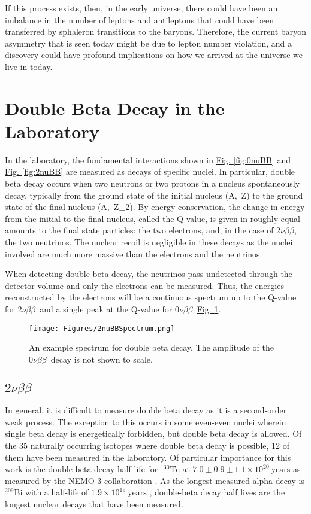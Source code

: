 \documentclass[12pt,a4paper]{article}
\newcommand{\zeronubb}{$0\nu \beta \beta$}
\newcommand{\twonubb}{$2\nu \beta \beta$}
\begin{document}
If this process exists, then, in the early universe, there could have been an imbalance in the number of leptons and antileptons that could have been transferred by sphaleron transitions to the baryons. Therefore, the current baryon asymmetry that is seen today might be due to lepton number violation, and a discovery could have profound implications on how we arrived at the universe we live in today.


\section{Double Beta Decay in the Laboratory}

In the laboratory, the fundamental interactions shown in \hyperref[fig:0nuBB]{Fig. \ref*{fig:0nuBB}} and \hyperref[fig:2nuBB]{Fig. \ref*{fig:2nuBB}} are measured as decays of specific nuclei. In particular, double beta decay occurs when two neutrons or two protons in a nucleus spontaneously decay, typically from the ground state of the initial nucleus (A,~Z) to the ground state of the final nucleus (A,~Z$\pm$2). By energy conservation, the change in energy from the initial to the final nucleus, called the Q-value, is given in roughly equal amounts to the final state particles: the two electrons, and, in the case of \twonubb, the two neutrinos. The nuclear recoil is negligible in these decays as the nuclei involved are much more massive than the electrons and the neutrinos. 

When detecting double beta decay, the neutrinos pass undetected through the detector volume and only the electrons can be measured. Thus, the energies reconstructed by the electrons will be a continuous spectrum up to the Q-value for \twonubb~and a single peak at the Q-value for \zeronubb~\hyperref[fig:2nubbspectrum]{Fig. \ref*{fig:2nubbspectrum}}.

\begin{figure} [h]
\centering
\texttt{[image: Figures/2nuBBSpectrum.png]}
\caption{An example spectrum for double beta decay. The amplitude of the \zeronubb~decay is not shown to scale.}
\label{fig:2nubbspectrum}
\end{figure}


\subsection{\twonubb}
In general, it is difficult to measure double beta decay as it is a second-order weak process. The exception to this occurs in some even-even nuclei wherein single beta decay is energetically forbidden, but double beta decay is allowed. Of the 35 naturally occurring isotopes where double beta decay is possible, 12 of them have been measured in the laboratory. Of particular importance for this work is the double beta decay half-life for $^{130}\textrm{Te}$ at $7.0 \pm 0.9 \pm 1.1 \times 10^{20}~\textrm{years}$ as measured by the NEMO-3 collaboration \cite{Arnold:2011gq}. As the longest measured alpha decay is $^{209}\textrm{Bi}$ with a half-life of $1.9 \times 10^{19}~\textrm{years}$ \cite{Marcillac:2003Bi-209detection}, double-beta decay half lives are the longest nuclear decays that have been measured.
\end{document}
